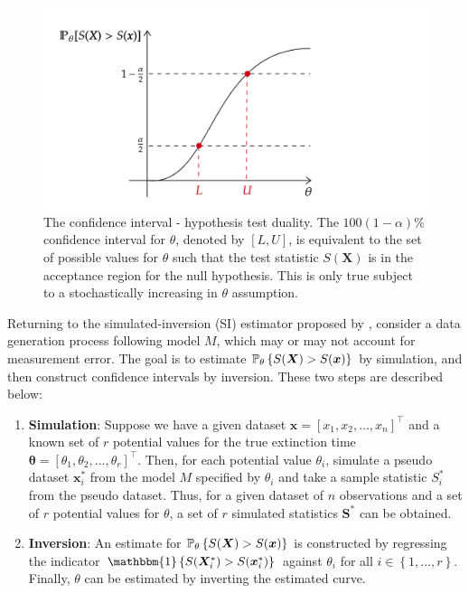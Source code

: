 \begin{figure}[ht]
    \centering
    \includegraphics[width=\linewidth]{figures/inversion-diagram.png}
    \caption{The confidence interval - hypothesis test duality. The $100(1-\alpha)\%$ confidence interval for $\theta$, denoted by $[L, U]$, is equivalent to the set of possible values for $\theta$ such that the test statistic $S(\bm{X})$ is in the acceptance region for the null hypothesis. This is only true subject to a stochastically increasing in $\theta$ assumption.}
    \label{fig:inversion_diagram}
\end{figure}

Returning to the simulated-inversion (SI) estimator proposed by \citet{Huang2019}, consider a data generation process following model $M$, which may or may not account for measurement error. The goal is to estimate $\mathbb{P}_\theta\left\{S(\bm{X}) > S(\bm{x})\right\}$ by simulation, and then construct confidence intervals by inversion. These two steps are described below:

\begin{enumerate}
    \item \textbf{Simulation}: Suppose we have a given dataset $\bm{x} = [x_1, x_2, \dots, x_n]^\top$ and a known set of $r$ potential values for the true extinction time $\bm{\theta} = [\theta_1, \theta_2, \dots, \theta_r]^\top$. Then, for each potential value $\theta_i$, simulate a pseudo dataset $\bm{x}^*_i$ from the model $M$ specified by $\theta_i$ and take a sample statistic $S^*_i$ from the pseudo dataset. Thus, for a given dataset of $n$ observations and a set of $r$ potential values for $\theta$, a set of $r$ simulated statistics $\bm{S}^*$ can be obtained.
    \item \textbf{Inversion}: An estimate for $\mathbb{P}_\theta\left\{S(\bm{X}) > S(\bm{x})\right\}$ is constructed by regressing the indicator $\mathbbm{1}\left\{ S(\bm{X}^*_i) > S(\bm{x}^*_i) \right\}$ against $\theta_i$ for all $i \in \left\{ 1, \dots, r \right\}$. Finally, $\theta$ can be estimated by inverting the estimated curve.
\end{enumerate}

